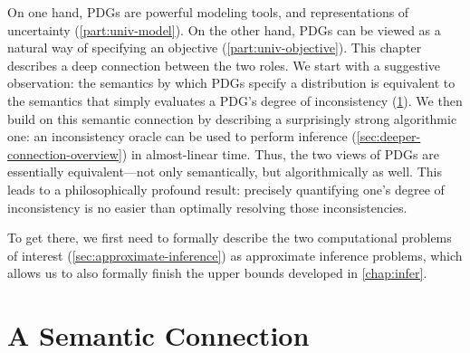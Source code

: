     \label{chap:inc-infer-connection}


On one hand, PDGs are powerful modeling tools, and representations of uncertainty (\cref{part:univ-model}).
On the other hand, PDGs can be viewed as a natural way of specifying
    an objective (\cref{part:univ-objective}).
This chapter describes a deep connection between the two roles. 
We start with a suggestive observation:
the semantics by which PDGs specify a distribution is equivalent to the semantics that simply evaluates a PDG's degree of inconsistency (\cref{sec:semantic-connection}). 
We then build on this semantic connection by describing a surprisingly strong algorithmic one: an inconsistency oracle can be used to perform inference (\cref{sec:deeper-connection-overview}) in almost-linear time. 
Thus, the two views of PDGs are essentially equivalent---not only semantically, but algorithmically as well.
%
This leads to a philosophically profound result: precisely quantifying one's degree of inconsistency is no easier than optimally resolving those inconsistencies. 

To get there, we first need to formally describe the two computational problems of interest (\cref{sec:approximate-inference}) as approximate inference problems,
which allows us to also
formally finish the upper bounds developed in \cref{chap:infer}.

 
\section{A Semantic Connection}
    \label{sec:semantic-connection}

